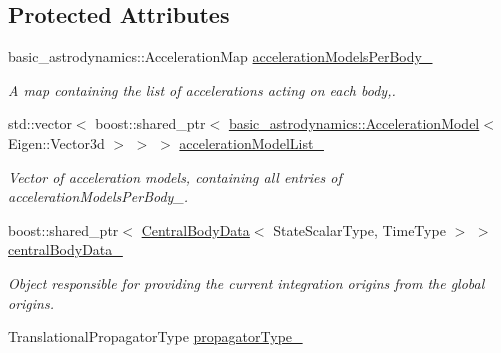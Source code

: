 \subsection*{Protected Attributes}
\begin{DoxyCompactItemize}
\item 
basic\+\_\+astrodynamics\+::\+Acceleration\+Map \hyperlink{classtudat_1_1propagators_1_1NBodyStateDerivative_aa9ae6d8dfda131ffca5b23c1564342af}{acceleration\+Models\+Per\+Body\+\_\+}
\begin{DoxyCompactList}\small\item\em A map containing the list of accelerations acting on each body,. \end{DoxyCompactList}\item 
std\+::vector$<$ boost\+::shared\+\_\+ptr$<$ \hyperlink{classtudat_1_1basic__astrodynamics_1_1AccelerationModel}{basic\+\_\+astrodynamics\+::\+Acceleration\+Model}$<$ Eigen\+::\+Vector3d $>$ $>$ $>$ \hyperlink{classtudat_1_1propagators_1_1NBodyStateDerivative_a0c1448d2a35b826e8e97a21e8cf32d12}{acceleration\+Model\+List\+\_\+}\hypertarget{classtudat_1_1propagators_1_1NBodyStateDerivative_a0c1448d2a35b826e8e97a21e8cf32d12}{}\label{classtudat_1_1propagators_1_1NBodyStateDerivative_a0c1448d2a35b826e8e97a21e8cf32d12}

\begin{DoxyCompactList}\small\item\em Vector of acceleration models, containing all entries of acceleration\+Models\+Per\+Body\+\_\+. \end{DoxyCompactList}\item 
boost\+::shared\+\_\+ptr$<$ \hyperlink{classtudat_1_1propagators_1_1CentralBodyData}{Central\+Body\+Data}$<$ State\+Scalar\+Type, Time\+Type $>$ $>$ \hyperlink{classtudat_1_1propagators_1_1NBodyStateDerivative_a07725dacbad6336f213dd64f2291b70a}{central\+Body\+Data\+\_\+}\hypertarget{classtudat_1_1propagators_1_1NBodyStateDerivative_a07725dacbad6336f213dd64f2291b70a}{}\label{classtudat_1_1propagators_1_1NBodyStateDerivative_a07725dacbad6336f213dd64f2291b70a}

\begin{DoxyCompactList}\small\item\em Object responsible for providing the current integration origins from the global origins. \end{DoxyCompactList}\item 
Translational\+Propagator\+Type \hyperlink{classtudat_1_1propagators_1_1NBodyStateDerivative_a0b30df07d47b0cf367fe633fd15c5736}{propagator\+Type\+\_\+}\hypertarget{classtudat_1_1propagators_1_1NBodyStateDerivative_a0b30df07d47b0cf367fe633fd15c5736}{}\label{classtudat_1_1propagators_1_1NBodyStateDerivative_a0b30df07d47b0cf367fe633fd15c5736}


\end{DoxyCompactItemize}
